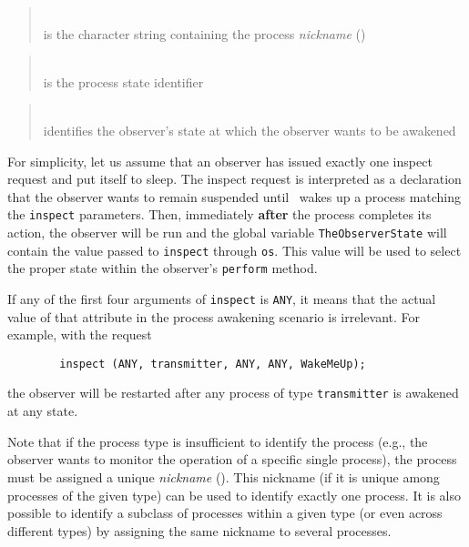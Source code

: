 \begin{quote}
\noindent{}\\ \hspace{0in}
is the character string containing the process {\em nickname}
()
\end{quote}

\begin{quote}
\noindent{}\\ \hspace{0in}
is the process state identifier
\end{quote}

\begin{quote}
\noindent{}\\ \hspace{0in}
identifies the observer's state at which the observer wants to be awakened
\end{quote}\medskip

For simplicity, let us assume that an observer has issued exactly
one inspect request and put itself to sleep.
The inspect request is interpreted as a declaration that the observer
wants to remain suspended until \smurph\ wakes up a
process matching the {\tt inspect} parameters.
Then, immediately {\bf after} the process completes its action, the
observer will be run and the global
variable {\tt TheObserverState} will contain the value passed to
{\tt inspect} through {\tt os}.
This value will be used to select the proper state within the
observer's {\tt perform} method.

If any of the first four arguments of {\tt inspect} is {\tt ANY},
it means that the actual value of that attribute in the process
awakening scenario is irrelevant.
For example, with the request
\begin{verbatim}
        inspect (ANY, transmitter, ANY, ANY, WakeMeUp);
\end{verbatim}
the observer will be restarted after any process of type {\tt transmitter}
is awakened at any state.

Note that if the process type is insufficient to identify the process (e.g.,
the observer wants to monitor the operation of a specific single process),
the process must be assigned a unique {\em nickname} ().
This nickname (if it is unique among processes of the given type) can
be used to identify exactly one process.
It is also possible to identify a subclass of processes within a given
type (or even across different types) by assigning the same nickname to
several processes.

